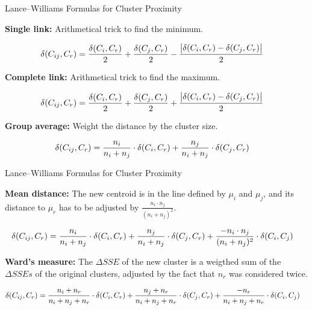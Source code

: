 \begin{frame}{Lance--Williams Formulas for Cluster Proximity}

\textbf{Single link:} Arithmetical trick to find the minimum.

\begin{align*}
    \delta(C_{ij},C_r) & =
	\frac{\delta(C_i,C_r)}{2} +
	\frac{\delta(C_{j},C_r)}{2} -
	\frac{\bigl|\delta(C_i,C_r)-\delta(C_{j},C_r)\bigr|}{2}
\end{align*}

\textbf{Complete link:} Arithmetical trick to find the maximum.

\begin{align*}
    \delta(C_{ij},C_r) & =
	\frac{\delta(C_i,C_r)}{2} +
	\frac{\delta(C_{j},C_r)}{2} +
	\frac{\bigl|\delta(C_i,C_r)-\delta(C_{j},C_r)\bigr|}{2}
\end{align*}

\textbf{Group average:} Weight the distance by the cluster size.

\begin{align*}
    \delta(C_{ij},C_r) & =
	\frac{n_i}{n_i+n_j} \cdot \delta(C_i,C_r) +
	\frac{n_j}{n_i+n_j} \cdot \delta(C_j,C_r) 
\end{align*}

\end{frame}

\begin{frame}{Lance--Williams Formulas for Cluster Proximity}

\textbf{Mean distance:} The new centroid is in the line defined by $\mu_i$ and $\mu_j$, and its distance to $\mu_r$ has to be adjusted by $\frac{n_i \cdot n_j}{(n_i+n_j)^2}$.

\begin{align*}
    \delta(C_{ij},C_r) & =
	\frac{n_i}{n_i+n_j} \cdot \delta(C_i,C_r) +
	\frac{n_j}{n_i+n_j} \cdot \delta(C_j,C_r) +
	\frac{-n_i \cdot n_j}{(n_i+n_j)^2} \cdot \delta(C_i,C_{j}) 
\end{align*}

\textbf{Ward's measure:} The $\Delta SSE$ of the new cluster is a weigthed sum of the $\Delta SSEs$ of the original clusters, adjusted by the fact that $n_r$ was considered twice.

\begin{align*}
    \delta(C_{ij},C_r) & =
	\frac{n_i+n_r}{n_i+n_j+n_r} \cdot \delta(C_i,C_r) +
	\frac{n_j+n_r}{n_i+n_j+n_r} \cdot \delta(C_j,C_r) +
	\frac{-n_r}{n_i+n_j+n_r} \cdot \delta(C_i,C_{j}) 
\end{align*}

\end{frame}

